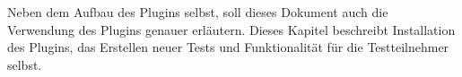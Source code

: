 Neben dem Aufbau des Plugins selbst, soll dieses Dokument auch die Verwendung des Plugins genauer erläutern. Dieses Kapitel beschreibt Installation des Plugins, das Erstellen neuer Tests und Funktionalität für die Testteilnehmer selbst.

